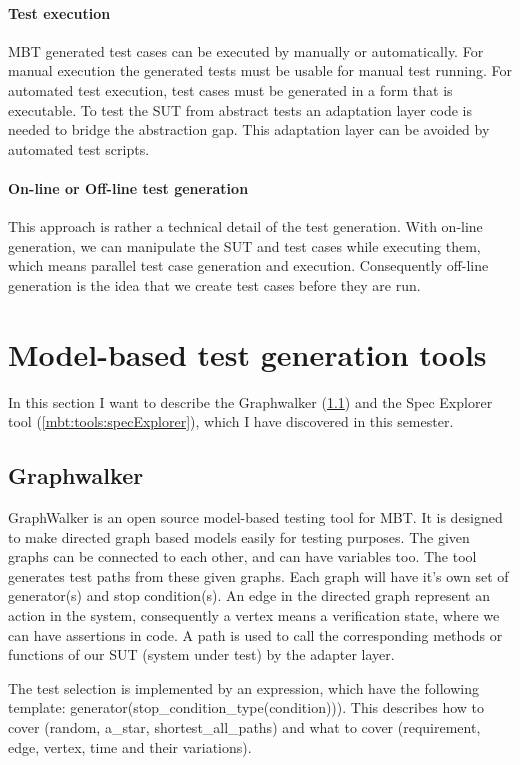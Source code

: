 \paragraph{Test execution}
MBT generated test cases can be executed by manually or automatically. For manual execution the generated tests must be usable for manual test running. For automated test execution, test cases must be generated in a form that is executable. To test the SUT from abstract tests an adaptation layer code is needed to bridge the abstraction gap. This adaptation layer can be avoided by automated test scripts.

\paragraph{On-line or Off-line test generation}
This approach is rather a technical detail of the test generation. With on-line generation, we can manipulate the SUT and test cases while executing them, which means parallel test case generation and execution. Consequently off-line generation is the idea that we create test cases before they are run.

\section{Model-based test generation tools}
In this section I want to describe the Graphwalker (\ref{mbt:tools:graphwalker}) and the Spec Explorer tool (\ref{mbt:tools:specExplorer}), which I have discovered in this semester.

\subsection{Graphwalker} \label{mbt:tools:graphwalker}

GraphWalker is an open source model-based testing tool for MBT. It is designed to make directed graph based models easily for testing purposes. The given graphs can be connected to each other, and can have variables too. The tool generates test paths from these given graphs. Each graph will have it's own set of generator(s) and stop condition(s). An edge in the directed graph represent an action in the system, consequently a vertex means a verification state, where we can have assertions in code. A path is used to call the corresponding methods or functions of our SUT (system under test) by the adapter layer. 

The test selection is implemented by an expression, which have the following template: generator(stop\_condition\_type(condition))). This describes how to cover (random, a\_star, shortest\_all\_paths) and what to cover (requirement, edge, vertex, time and their variations).

